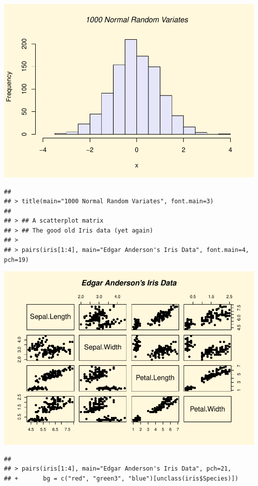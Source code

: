 \documentclass[]{book}
\begin{document}
\includegraphics{TudodoR_files/figure-latex/unnamed-chunk-147-7.pdf}

\begin{verbatim}
## 
## > title(main="1000 Normal Random Variates", font.main=3)
## 
## > ## A scatterplot matrix
## > ## The good old Iris data (yet again)
## > 
## > pairs(iris[1:4], main="Edgar Anderson's Iris Data", font.main=4, pch=19)
\end{verbatim}

\includegraphics{TudodoR_files/figure-latex/unnamed-chunk-147-8.pdf}

\begin{verbatim}
## 
## > pairs(iris[1:4], main="Edgar Anderson's Iris Data", pch=21,
## +       bg = c("red", "green3", "blue")[unclass(iris$Species)])
\end{verbatim}
\end{document}
